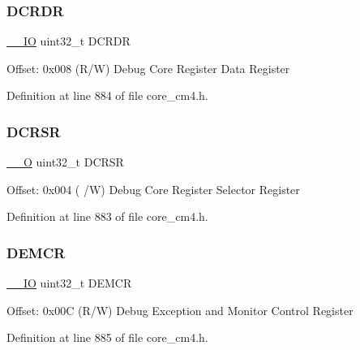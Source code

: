 \subsubsection{\texorpdfstring{D\+C\+R\+DR}{DCRDR}}
{\footnotesize\ttfamily \hyperlink{group___c_m_s_i_s__core__definitions_gaec43007d9998a0a0e01faede4133d6be}{\+\_\+\+\_\+\+IO} uint32\+\_\+t D\+C\+R\+DR}

Offset\+: 0x008 (R/W) Debug Core Register Data Register 

Definition at line 884 of file core\+\_\+cm4.\+h.

\mbox{\label{struct_core_debug___type_a7b49cb58573da77cc8a83a1b21262180}} 
\subsubsection{\texorpdfstring{D\+C\+R\+SR}{DCRSR}}
{\footnotesize\ttfamily \hyperlink{group___c_m_s_i_s__core__definitions_ga7e25d9380f9ef903923964322e71f2f6}{\+\_\+\+\_\+O} uint32\+\_\+t D\+C\+R\+SR}

Offset\+: 0x004 ( /W) Debug Core Register Selector Register 

Definition at line 883 of file core\+\_\+cm4.\+h.

\mbox{\label{struct_core_debug___type_a6cdfc0a6ce3e988cc02c2d6e8107d193}} 
\subsubsection{\texorpdfstring{D\+E\+M\+CR}{DEMCR}}
{\footnotesize\ttfamily \hyperlink{group___c_m_s_i_s__core__definitions_gaec43007d9998a0a0e01faede4133d6be}{\+\_\+\+\_\+\+IO} uint32\+\_\+t D\+E\+M\+CR}

Offset\+: 0x00C (R/W) Debug Exception and Monitor Control Register 

Definition at line 885 of file core\+\_\+cm4.\+h.

\mbox{\label{struct_core_debug___type_a39bc5e68dc6071187fbe2348891eabfa}} 
